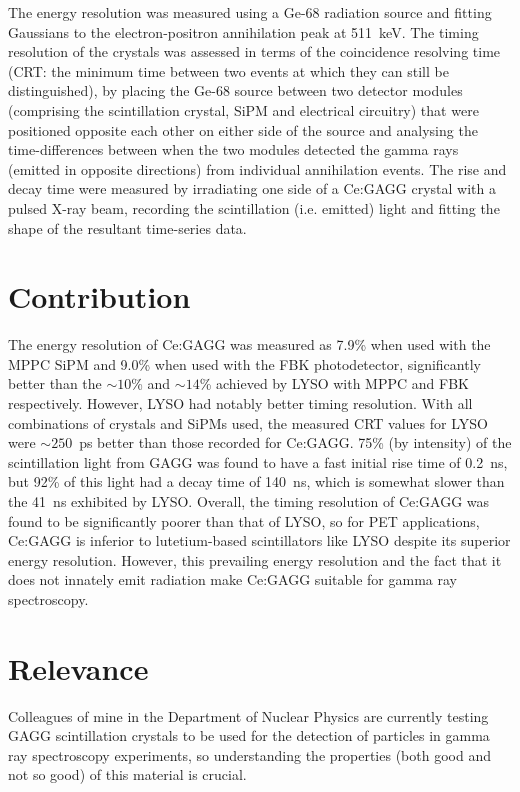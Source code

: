 \documentclass[12pt,a4paper]{article}
\begin{document}
\medskip
The energy resolution was measured using a Ge-68 radiation source and fitting Gaussians to the electron-positron annihilation peak at 511~keV. The timing resolution of the crystals was assessed in terms of the coincidence resolving time (CRT: the minimum time between two events at which they can still be distinguished), by placing the Ge-68 source between two detector modules (comprising the scintillation crystal, SiPM and electrical circuitry) that were positioned opposite each other on either side of the source and analysing the time-differences between when the two modules detected the gamma rays (emitted in opposite directions) from individual annihilation events.
The rise and decay time were measured by irradiating one side of a Ce:GAGG crystal with a pulsed X-ray beam, recording the scintillation (i.e. emitted) light and fitting the shape of the resultant time-series data.

\section*{Contribution}
The energy resolution of Ce:GAGG was measured as 7.9\% when used with the MPPC SiPM and 9.0\% when used with the FBK photodetector, significantly better than the $\sim10$\% and $\sim14$\% achieved by LYSO with MPPC and FBK respectively. However, LYSO had notably better timing resolution. With all combinations of crystals and SiPMs used, the measured CRT values for LYSO were $\sim250$~ps better than those recorded for Ce:GAGG. 75\% (by intensity) of the scintillation light from GAGG was found to have a fast initial rise time of 0.2~ns, but 92\% of this light had a decay time of 140~ns, which is somewhat slower than the 41~ns exhibited by LYSO. Overall, the timing resolution of Ce:GAGG was found to be significantly poorer than that of LYSO, so for PET applications, Ce:GAGG is inferior to lutetium-based scintillators like LYSO despite its superior energy resolution. However, this prevailing energy resolution and the fact that it does not innately emit radiation make Ce:GAGG suitable for gamma ray spectroscopy. 

\section*{Relevance}
Colleagues of mine in the Department of Nuclear Physics are currently testing GAGG scintillation crystals to be used for the detection of particles in gamma ray spectroscopy experiments, so understanding the properties (both good and not so good) of this material is crucial. 
\end{document}
